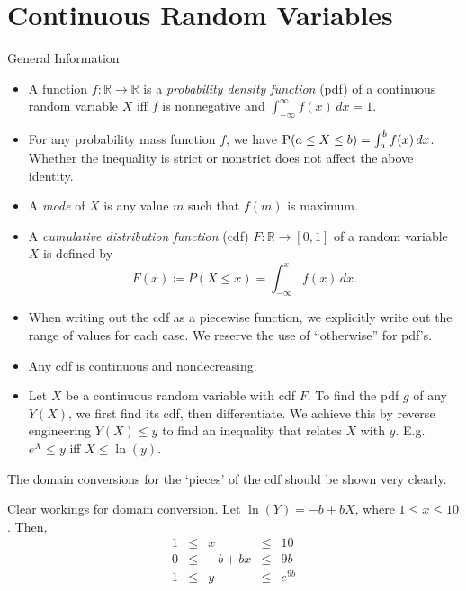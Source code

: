 \chapter{Continuous Random Variables}
\begin{stbox}{General Information}
  \begin{itemize}
    \item A function \(f \colon \mathbb{R}\to \mathbb{R}\) is a \emph{probability density function} (pdf) of a continuous random variable \(X\) iff \(f\) is nonnegative and \(\int_{-\infty}^{\infty}f(x)\,dx=1\).
    \item For any probability mass function \(f\), we have \(\operatorname{P}(a\leq X\leq b)=\int_{a}^{b}f(x)\,dx\). Whether the inequality is strict or nonstrict does not affect the above identity. 
    \item A \emph{mode} of \(X\) is any value \(m\) such that \(f(m)\) is maximum.
    \item A \emph{cumulative distribution function} (cdf) \(F \colon \mathbb{R}\to [0,1]\) of a random variable \(X\) is defined by
    \[F(x)\coloneq P(X\leq x)=\int_{-\infty}^{x}f(x)\,dx.\]
    \item When writing out the cdf as a piecewise function, we explicitly write out the range of values for each case. We reserve the use of ``otherwise'' for pdf's.
    \item Any cdf is continuous and nondecreasing.
    \item Let \(X\) be a continuous random variable with cdf \(F\). To find the pdf \(g\) of any \(Y(X)\), we first find its cdf, then differentiate. We achieve this by reverse engineering \(Y(X)\leq y\) to find an inequality that relates \(X\) with \(y\). E.g. \(e^X\leq y\) iff \(X\leq \ln(y)\).
  \end{itemize}
\end{stbox}
\begin{note}
  The domain conversions for the `pieces' of the cdf should be shown very clearly.
\end{note}
\begin{example}{Clear workings for domain conversion.}{}
  Let \(\ln(Y)=-b+bX\), where \(1\leq x\leq 10\). Then,
  \[\begin{array}{rcccl}
    1 &\leq& x      &\leq& 10\\
    0 &\leq& -b+bx  &\leq& 9b\\
    1 &\leq& y      &\leq& e^{9b}
  \end{array}\]
\end{example}
